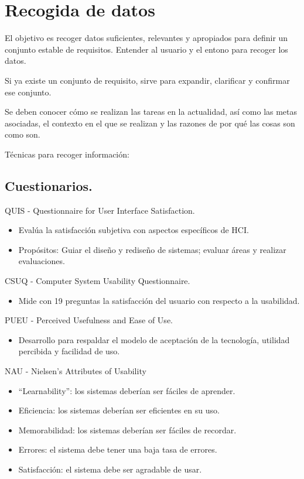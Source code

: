 \documentclass[12pt, twoside, openright]{report} %
\begin{document}
\section{Recogida de datos}



El objetivo es recoger datos suficientes, relevantes y apropiados
para definir un conjunto estable de requisitos. Entender al usuario
y el entono para recoger los datos.

Si ya existe un conjunto de requisito, sirve para expandir,
clarificar y confirmar ese conjunto.

Se deben conocer cómo se realizan las tareas en la actualidad, así
como las metas asociadas, el contexto en el que se realizan y las
razones de por qué las cosas son como son.

Técnicas para recoger información:

\subsection{Cuestionarios.}

QUIS - Questionnaire for User Interface Satisfaction.

\begin{itemize}
	\item Evalúa la satisfacción subjetiva con aspectos específicos de
	      HCI.
	\item Propósitos: Guiar el diseño y rediseño de sistemas; evaluar
	      áreas y realizar evaluaciones.
\end{itemize}
\pagebreak
CSUQ - Computer System Usability Questionnaire.

\begin{itemize}
	\item Mide con 19 preguntas la satisfacción del usuario con respecto
	      a la usabilidad.
\end{itemize}

PUEU - Perceived Usefulness and Ease of Use.

\begin{itemize}
	\item Desarrollo para respaldar el modelo de aceptación de la
	      tecnología, utilidad percibida y facilidad de uso.
\end{itemize}

NAU - Nielsen's Attributes of Usability

\begin{itemize}
	\item ``Learnability'': los sistemas deberían ser fáciles de
	      aprender.
	\item Eficiencia: los sistemas deberían ser eficientes en su uso.
	\item Memorabilidad: los sistemas deberían ser fáciles de recordar.
	\item Errores: el sistema debe tener una baja tasa de errores.
	\item Satisfacción: el sistema debe ser agradable de usar.
\end{itemize}
\end{document}
